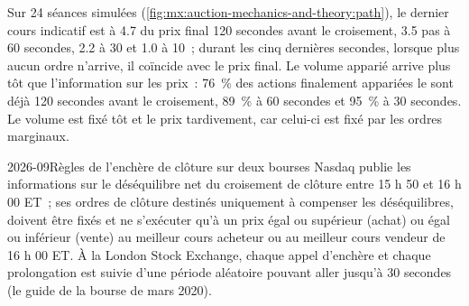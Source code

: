 \begin{omfigure}

\label{fig:mx:auction-mechanics-and-theory:path}
\end{omfigure}

Sur 24 séances simulées (\cref{fig:mx:auction-mechanics-and-theory:path}), le dernier cours indicatif est à 4.7  du prix final 120 secondes avant le
croisement, 3.5 pas à 60 secondes, 2.2 à 30 et 1.0 à 10~; durant les cinq dernières secondes, lorsque plus aucun ordre n'arrive, il coïncide avec le prix final.
Le volume apparié arrive plus tôt que l'information sur les prix~: 76~\% des actions finalement appariées le sont déjà 120 secondes avant le croisement, 89~\% à 60 secondes et 95~\% à 30 secondes. Le volume est
fixé tôt et le prix tardivement, car celui-ci est fixé par les ordres marginaux.

\begin{dated}{2026-09}{Règles de l'enchère de clôture sur deux bourses}\label{dat:mx:auction-mechanics-and-theory:rules}
Nasdaq publie les informations sur le déséquilibre net du croisement de clôture entre 15 h 50 et 16 h 00 ET~; ses ordres de clôture destinés uniquement à compenser les
déséquilibres, doivent être fixés et ne s'exécuter qu'à un prix égal ou supérieur (achat) ou égal ou inférieur (vente) au meilleur cours acheteur ou au meilleur cours vendeur de 16 h 00 ET. À la London Stock Exchange, chaque appel d'enchère et
chaque prolongation est suivie d'une période aléatoire pouvant aller jusqu'à 30 secondes (le guide de la bourse de mars 2020).
\end{dated}

